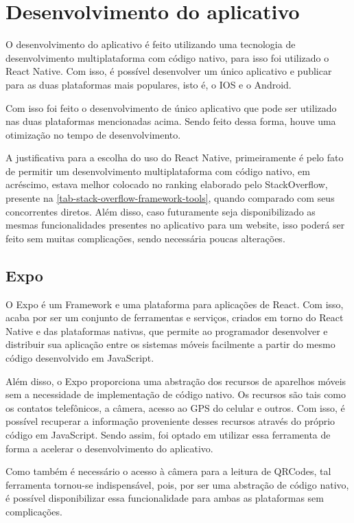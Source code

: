\section{Desenvolvimento do aplicativo}\label{desenvApp}

O desenvolvimento do aplicativo é feito utilizando uma tecnologia de desenvolvimento multiplataforma com código nativo, para isso foi utilizado o React Native. Com isso, é possível desenvolver um único aplicativo e publicar para as duas plataformas mais populares, isto é, o IOS e o Android.

Com isso foi feito o desenvolvimento de único aplicativo que pode ser utilizado nas duas plataformas mencionadas acima. Sendo feito dessa forma, houve uma otimização no tempo de desenvolvimento.

A justificativa para a escolha do uso do React Native, primeiramente é pelo fato de permitir um desenvolvimento multiplataforma com código nativo, em acréscimo, estava melhor colocado no ranking elaborado pelo StackOverflow, presente na \autoref{tab-stack-overflow-framework-tools}, quando comparado com seus concorrentes diretos. Além disso, caso futuramente seja disponibilizado as mesmas funcionalidades presentes no aplicativo para um website, isso poderá ser feito sem muitas complicações, sendo necessária poucas alterações.

\subsection{Expo}

O Expo é um Framework e uma plataforma para aplicações de React. Com isso, acaba por ser um conjunto de ferramentas e serviços, criados em torno do React Native e das plataformas nativas, que permite ao programador desenvolver e distribuir sua aplicação entre os sistemas móveis facilmente a partir do mesmo código desenvolvido em JavaScript.

Além disso, o Expo proporciona uma abstração dos recursos de aparelhos móveis sem a necessidade de implementação de código nativo. Os recursos são tais como os contatos telefônicos, a câmera, acesso ao GPS do celular e outros. Com isso, é possível recuperar a informação proveniente desses recursos através do próprio código em JavaScript. Sendo assim, foi optado em utilizar essa ferramenta de forma a acelerar o desenvolvimento do aplicativo.

Como também é necessário o acesso à câmera para a leitura de QRCodes, tal ferramenta tornou-se indispensável, pois, por ser uma abstração de código nativo, é possível disponibilizar essa funcionalidade para ambas as plataformas sem complicações.

